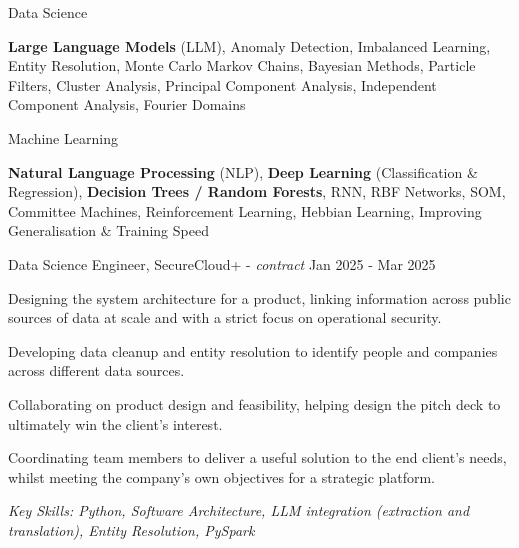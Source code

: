 \documentclass[11pt,article,oneside]{memoir}
\newenvironment{itemize*}{%
  \renewcommand\labelitemi{\textbullet}
  \footnotesize
  \begin{itemize}%
    \setlength{\itemsep}{0pt}}%
  {\end{itemize}
}
\begin{document}
\ind Data Science

\ind \hspace{0.354in} \footnotesize \textbf{Large Language Models} (LLM), Anomaly Detection, Imbalanced Learning, Entity Resolution, 
    Monte Carlo Markov Chains, Bayesian Methods, Particle Filters, 
    Cluster Analysis, Principal Component Analysis, Independent Component Analysis, Fourier Domains \normalsize

\ind Machine Learning 

\ind \hspace{0.354in} \footnotesize \textbf{Natural Language Processing} (NLP), \textbf{Deep Learning} (Classification \& Regression), \textbf{Decision Trees / Random Forests},
    RNN, RBF Networks, SOM, Committee Machines, Reinforcement Learning, Hebbian Learning, Improving Generalisation \& Training Speed \normalsize

\bigskip
 

\normalsize
\medskip
\ind Data Science Engineer, SecureCloud+ - \emph{contract} \hfill Jan 2025 - Mar 2025
\begin{itemize*}
    \item Designing the system architecture for a product, linking information across public sources of data at scale and with a strict focus on operational security.
    \item Developing data cleanup and entity resolution to identify people and companies across different data sources.
    \item Collaborating on product design and feasibility, helping design the pitch deck to ultimately win the client's interest.
    \item Coordinating team members to deliver a useful solution to the end client's needs, whilst meeting the company's own objectives for a strategic platform. 
\end{itemize*}
\ind \hspace{0.35in} \footnotesize \emph{Key Skills: Python, Software Architecture, LLM integration (extraction and translation), Entity Resolution, PySpark}
\end{document}

